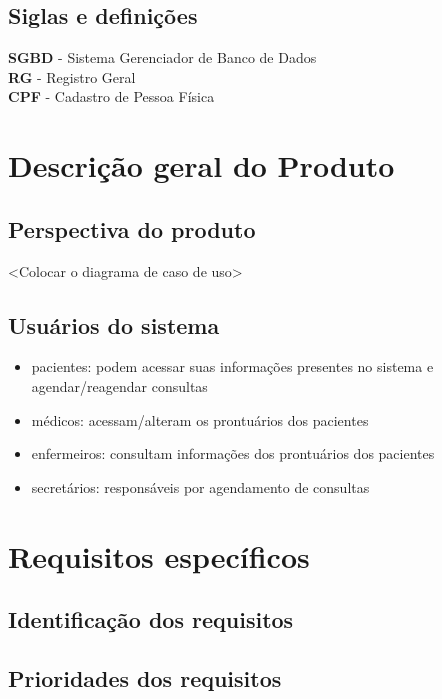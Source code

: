\documentclass[12pt,a4paper]{report}
\begin{document}
\subsection{Siglas e definições}

\textbf{SGBD} - Sistema Gerenciador de Banco de Dados \\
\textbf{RG}   - Registro Geral\\
\textbf{CPF}  - Cadastro de Pessoa Física\\



\section{Descrição geral do Produto}

\subsection{Perspectiva do produto} 

<Colocar o diagrama de caso de uso>

\subsection{Usuários do sistema}

\begin{itemize}
\item pacientes: podem acessar suas informações presentes no sistema e agendar/reagendar consultas
\item médicos: acessam/alteram os prontuários dos pacientes
\item enfermeiros: consultam informações dos prontuários dos pacientes
\item secretários: responsáveis por agendamento de consultas

\end{itemize}




\section{Requisitos específicos}


\subsection{Identificação dos requisitos}

\subsection{Prioridades dos requisitos}
\end{document}
